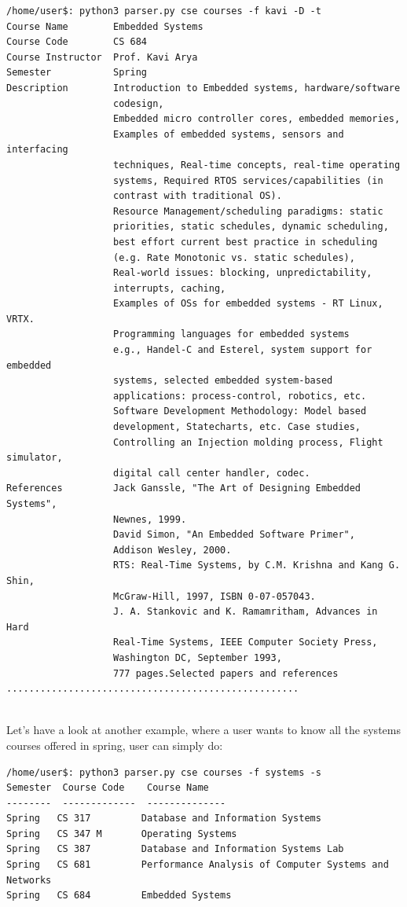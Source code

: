 \documentclass[12pt, letterpaper, twoside]{article}
\begin{document}
\begin{verbatim}
/home/user$: python3 parser.py cse courses -f kavi -D -t
Course Name        Embedded Systems
Course Code        CS 684
Course Instructor  Prof. Kavi Arya
Semester           Spring
Description        Introduction to Embedded systems, hardware/software
                   codesign, 
                   Embedded micro controller cores, embedded memories, 
                   Examples of embedded systems, sensors and interfacing 
                   techniques, Real-time concepts, real-time operating 
                   systems, Required RTOS services/capabilities (in 
                   contrast with traditional OS).
                   Resource Management/scheduling paradigms: static 
                   priorities, static schedules, dynamic scheduling, 
                   best effort current best practice in scheduling 
                   (e.g. Rate Monotonic vs. static schedules), 
                   Real-world issues: blocking, unpredictability, 
                   interrupts, caching, 
                   Examples of OSs for embedded systems - RT Linux, VRTX.
                   Programming languages for embedded systems 
                   e.g., Handel-C and Esterel, system support for embedded 
                   systems, selected embedded system-based 
                   applications: process-control, robotics, etc. 
                   Software Development Methodology: Model based 
                   development, Statecharts, etc. Case studies, 
                   Controlling an Injection molding process, Flight simulator,
                   digital call center handler, codec.
References         Jack Ganssle, "The Art of Designing Embedded Systems", 
                   Newnes, 1999.
                   David Simon, "An Embedded Software Primer", 
                   Addison Wesley, 2000.
                   RTS: Real-Time Systems, by C.M. Krishna and Kang G. Shin, 
                   McGraw-Hill, 1997, ISBN 0-07-057043.
                   J. A. Stankovic and K. Ramamritham, Advances in Hard 
                   Real-Time Systems, IEEE Computer Society Press, 
                   Washington DC, September 1993, 
                   777 pages.Selected papers and references
....................................................
 
\end{verbatim}

Let's have a look at another example, where a user wants to know all the systems courses offered in spring, user can simply do:
\begin{verbatim}
/home/user$: python3 parser.py cse courses -f systems -s
Semester  Course Code    Course Name                                           
--------  -------------  --------------  
Spring   CS 317         Database and Information Systems                       
Spring   CS 347 M       Operating Systems                                      
Spring   CS 387         Database and Information Systems Lab                   
Spring   CS 681         Performance Analysis of Computer Systems and Networks  
Spring   CS 684         Embedded Systems
\end{verbatim}
\end{document}
